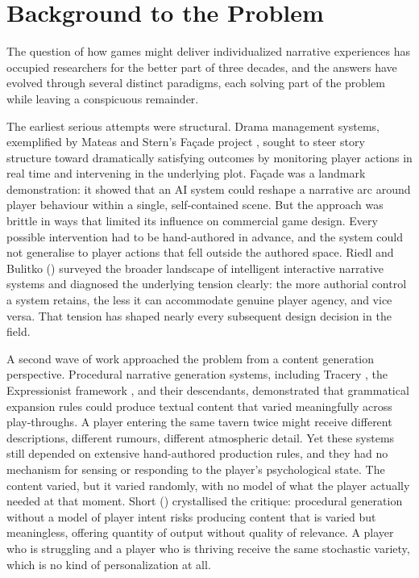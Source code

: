 \section{Background to the Problem}

The question of how games might deliver individualized narrative experiences has occupied researchers for the better part of three decades, and the answers have evolved through several distinct paradigms, each solving part of the problem while leaving a conspicuous remainder.

The earliest serious attempts were structural. Drama management systems, exemplified by Mateas and Stern's Fa\c{c}ade project \citep{mateas2003facade}, sought to steer story structure toward dramatically satisfying outcomes by monitoring player actions in real time and intervening in the underlying plot. Fa\c{c}ade was a landmark demonstration: it showed that an AI system could reshape a narrative arc around player behaviour within a single, self-contained scene. But the approach was brittle in ways that limited its influence on commercial game design. Every possible intervention had to be hand-authored in advance, and the system could not generalise to player actions that fell outside the authored space. Riedl and Bulitko (\citeyear{riedl2013interactive}) surveyed the broader landscape of intelligent interactive narrative systems and diagnosed the underlying tension clearly: the more authorial control a system retains, the less it can accommodate genuine player agency, and vice versa. That tension has shaped nearly every subsequent design decision in the field.

A second wave of work approached the problem from a content generation perspective. Procedural narrative generation systems, including Tracery \citep{compton2015tracery}, the Expressionist framework \citep{kreminski2019evaluating}, and their descendants, demonstrated that grammatical expansion rules could produce textual content that varied meaningfully across play-throughs. A player entering the same tavern twice might receive different descriptions, different rumours, different atmospheric detail. Yet these systems still depended on extensive hand-authored production rules, and they had no mechanism for sensing or responding to the player's psychological state. The content varied, but it varied randomly, with no model of what the player actually needed at that moment. Short (\citeyear{short2019procedural}) crystallised the critique: procedural generation without a model of player intent risks producing content that is varied but meaningless, offering quantity of output without quality of relevance. A player who is struggling and a player who is thriving receive the same stochastic variety, which is no kind of personalization at all.

